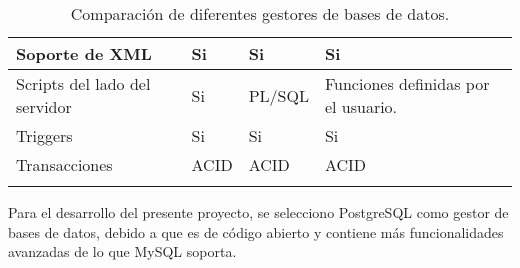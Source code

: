 \begin{center}
\begin{longtable}{|m{3.5cm}|m{3.5cm}|m{3.5cm}|m{3.5cm}|}
    \hline
    Soporte de XML                      &
    Si                                  &
    Si                                  &
    Si \\
    
    \hline
    Scripts del lado del servidor       &
    Si                                  &
    PL/SQL                              &
    Funciones definidas por el usuario. \\
    
    \hline
    Triggers                            &
    Si                                  &
    Si                                  &
    Si \\
    
    \hline
    Transacciones                       &
    ACID                                &
    ACID                                &
    ACID \\
    
    \hline
    
    \caption{Comparación de diferentes gestores de bases de datos.}
    \label{tbl:analisis-bases}
    
    \end{longtable}
\end{center}

Para el desarrollo del presente proyecto, se selecciono PostgreSQL como gestor de bases de datos, debido a que es de código abierto y contiene más funcionalidades avanzadas de lo que MySQL soporta.



